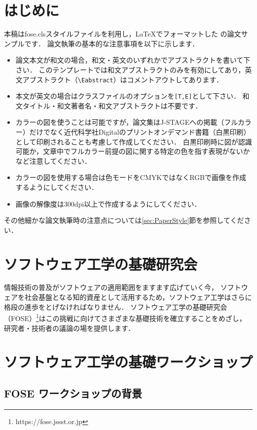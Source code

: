 \documentclass[T,J]{fose} %
\begin{document}
\section{はじめに}
本稿はfose.clsスタイルファイルを利用し，\LaTeX でフォーマットした \foseabbrev の論文サンプルです．
論文執筆の基本的な注意事項を以下に示します．
\begin{itemize}
\item 論文本文が和文の場合，和文・英文のいずれかでアブストラクトを書いて下さい．
このテンプレートでは和文アブストラクトのみを有効にしてあり，英文アブストラクト（\verb|\Eabstract|）はコメントアウトしてあります．
\item 本文が英文の場合はクラスファイルのオプションを{\verb|[T,E]|}として下さい．
和文タイトル・和文著者名・和文アブストラクトは不要です．
\item カラーの図を使うことは可能ですが，論文集はJ-STAGEへの掲載（フルカラー）だけでなく近代科学社Digitalのプリントオンデマンド書籍（白黒印刷）として印刷されることも考慮して作成してください．
白黒印刷時に図が認識可能か，文章中でフルカラー前提の図に関する特定の色を指す表現がないかなど注意してください．
\item カラーの図を使用する場合は色モードをCMYKではなくRGBで画像を作成するようにしてください．
\item 画像の解像度は300dpi以上で作成するようにしてください．
\end{itemize}
その他細かな論文執筆時の注意点については\ref{sec:PaperStyle}節を参照してください．


\section{ソフトウェア工学の基礎研究会}

情報技術の普及がソフトウェアの適用範囲をますます広げていく今，
ソフトウェアを社会基盤となる知的資産として活用するため，ソフトウェア工学はさらに格段の進歩をとげなければなりません．
ソフトウェア工学の基礎研究会（FOSE）\footnote{https://fose.jssst.or.jp}はこの挑戦に向けてさまざまな基礎技術を確立することをめざし，研究者・技術者の議論の場を提供します．

\section{ソフトウェア工学の基礎ワークショップ}

\subsection{FOSE ワークショップの背景}
\end{document}

